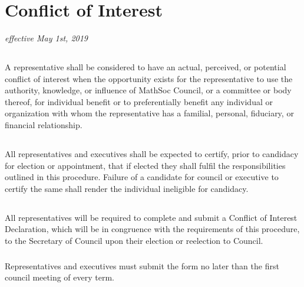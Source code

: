 \section{Conflict of Interest}
\emph{effective May 1st, 2019}

\subsection{}


A representative shall be considered to have an actual, perceived, or potential conflict of interest when the opportunity exists for the representative to use the authority, knowledge, or influence of MathSoc Council, or a committee or body thereof, for individual benefit or to preferentially benefit any individual or organization with whom the representative has a familial, personal, fiduciary, or financial relationship.

\subsection{}

All representatives and executives shall be expected to certify, prior to candidacy for election or appointment, that if elected they shall fulfil the responsibilities outlined in this procedure. Failure of a candidate for council or executive to certify the same shall render the individual ineligible for candidacy.

\subsection{}

All representatives will be required to complete and submit a Conflict of Interest Declaration, which will be in congruence with the requirements of this procedure, to the Secretary of Council upon their election or reelection to Council. 

\subsubsection{}

Representatives and executives must submit the form no later than the first council meeting of every term.

\subsubsection{}

